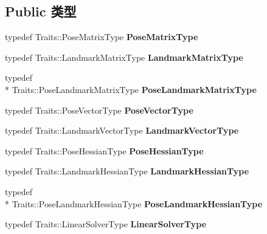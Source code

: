 \subsection*{Public 类型}
\begin{DoxyCompactItemize}
\item 
\hypertarget{classg2o_1_1BlockSolver_a8c7c43d361bd31e3e0353889ba703bc0}{typedef Traits\-::\-Pose\-Matrix\-Type {\bfseries Pose\-Matrix\-Type}}\label{classg2o_1_1BlockSolver_a8c7c43d361bd31e3e0353889ba703bc0}

\item 
\hypertarget{classg2o_1_1BlockSolver_afd898a666343291129d37a979e23ded6}{typedef Traits\-::\-Landmark\-Matrix\-Type {\bfseries Landmark\-Matrix\-Type}}\label{classg2o_1_1BlockSolver_afd898a666343291129d37a979e23ded6}

\item 
\hypertarget{classg2o_1_1BlockSolver_a96bf60b923f816086cd2f24de38736ec}{typedef \\*
Traits\-::\-Pose\-Landmark\-Matrix\-Type {\bfseries Pose\-Landmark\-Matrix\-Type}}\label{classg2o_1_1BlockSolver_a96bf60b923f816086cd2f24de38736ec}

\item 
\hypertarget{classg2o_1_1BlockSolver_a65d51b9281e2e2597df05eb00801ee76}{typedef Traits\-::\-Pose\-Vector\-Type {\bfseries Pose\-Vector\-Type}}\label{classg2o_1_1BlockSolver_a65d51b9281e2e2597df05eb00801ee76}

\item 
\hypertarget{classg2o_1_1BlockSolver_a19ade5e432f32e46557192ae75074304}{typedef Traits\-::\-Landmark\-Vector\-Type {\bfseries Landmark\-Vector\-Type}}\label{classg2o_1_1BlockSolver_a19ade5e432f32e46557192ae75074304}

\item 
\hypertarget{classg2o_1_1BlockSolver_a0e7f862860a1e3391cec3cfaf69c48be}{typedef Traits\-::\-Pose\-Hessian\-Type {\bfseries Pose\-Hessian\-Type}}\label{classg2o_1_1BlockSolver_a0e7f862860a1e3391cec3cfaf69c48be}

\item 
\hypertarget{classg2o_1_1BlockSolver_a465b1252905d90fd69b4243716620c45}{typedef Traits\-::\-Landmark\-Hessian\-Type {\bfseries Landmark\-Hessian\-Type}}\label{classg2o_1_1BlockSolver_a465b1252905d90fd69b4243716620c45}

\item 
\hypertarget{classg2o_1_1BlockSolver_aed8b44e394d2f19ca03c87adf90cc97c}{typedef \\*
Traits\-::\-Pose\-Landmark\-Hessian\-Type {\bfseries Pose\-Landmark\-Hessian\-Type}}\label{classg2o_1_1BlockSolver_aed8b44e394d2f19ca03c87adf90cc97c}

\item 
\hypertarget{classg2o_1_1BlockSolver_a717fa8cb1dd5a212e41d8ebef67955e6}{typedef Traits\-::\-Linear\-Solver\-Type {\bfseries Linear\-Solver\-Type}}\label{classg2o_1_1BlockSolver_a717fa8cb1dd5a212e41d8ebef67955e6}

\end{DoxyCompactItemize}
